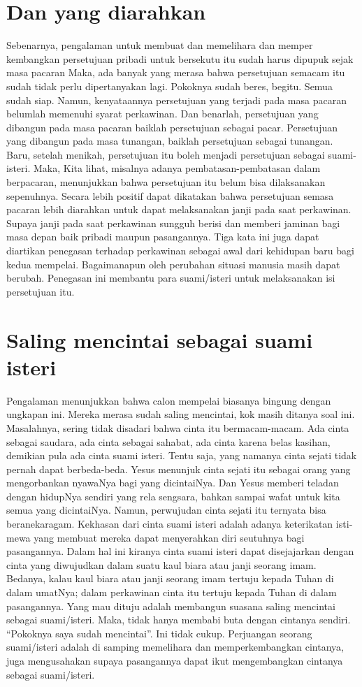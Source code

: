 \section{Dan yang diarahkan}
Sebenarnya, pengalaman untuk membuat dan memelihara dan memper kembangkan persetujuan pribadi untuk bersekutu itu sudah harus dipupuk sejak masa pacaran Maka, ada banyak yang merasa bahwa persetujuan semacam itu sudah tidak perlu dipertanyakan lagi. Pokok­nya sudah beres, begitu. Semua sudah siap. Namun, kenyataannya persetujuan yang terjadi pada masa pacaran belumlah memenuhi sya­rat perkawinan. Dan benarlah, persetujuan yang dibangun pada masa pacaran baiklah persetujuan sebagai pacar. Persetujuan yang dibangun pada masa tunangan, baiklah persetujuan sebagai tunangan. Baru, setelah menikah, persetujuan itu boleh menjadi persetujuan sebagai suami-isteri. Maka, Kita lihat, misalnya adanya pembatasan-pembatasan dalam berpacaran, menunjukkan bahwa persetujuan itu belum bisa dilaksanakan sepenuhnya. Secara lebih positif dapat dikatakan bahwa persetujuan semasa pacaran lebih diarahkan untuk dapat melaksanakan janji pada saat perkawinan. Supaya janji pada saat perkawinan sungguh berisi dan memberi jaminan bagi masa de­pan baik pribadi maupun pasangannya. Tiga kata ini juga dapat diartikan penegasan terhadap perkawi­nan sebagai awal dari kehidupan baru bagi kedua mempelai. Bagai­manapun oleh perubahan situasi manusia masih dapat berubah. Pene­gasan ini membantu para suami/isteri untuk melaksanakan isi persetujuan itu.

\section{Saling mencintai sebagai suami isteri}
Pengalaman menunjukkan bahwa calon mempelai biasanya bingung dengan ungkapan ini. Mereka merasa sudah saling mencintai, kok masih ditanya soal ini. Masalahnya, sering tidak disadari bahwa cinta itu bermacam-macam. Ada cinta sebagai saudara, ada cinta sebagai sahabat, ada cinta karena belas kasihan, demikian pula ada cinta suami isteri. Tentu saja, yang namanya cinta sejati tidak pernah dapat berbeda-beda. Yesus menunjuk cinta sejati itu seba­gai orang yang mengorbankan nyawaNya bagi yang dicintaiNya. Dan Yesus memberi teladan dengan hidupNya sendiri yang rela sengsa­ra, bahkan sampai wafat untuk kita semua yang dicintaiNya. Na­mun, perwujudan cinta sejati itu ternyata bisa beranekaragam. Kekhasan dari cinta suami isteri adalah adanya keterikatan isti­mewa yang membuat mereka dapat menyerahkan diri seutuhnya bagi pasangannya. Dalam hal ini kiranya cinta suami isteri dapat diseja­jarkan dengan cinta yang diwujudkan dalam suatu kaul biara atau janji seorang imam. Bedanya, kalau kaul biara atau janji seorang imam tertuju kepada Tuhan di dalam umatNya; dalam perkawinan cinta itu tertuju kepada Tuhan di dalam pasangannya. Yang mau dituju adalah membangun suasana saling mencintai sebagai suami/isteri. Maka, tidak hanya membabi buta dengan cintanya sendiri. “Pokoknya saya sudah mencintai”. Ini tidak cukup. Perjuangan seorang suami/isteri adalah di samping memelihara dan memperkembangkan cintanya, juga mengusahakan supaya pasangannya da­pat ikut mengembangkan cintanya sebagai suami/isteri.

